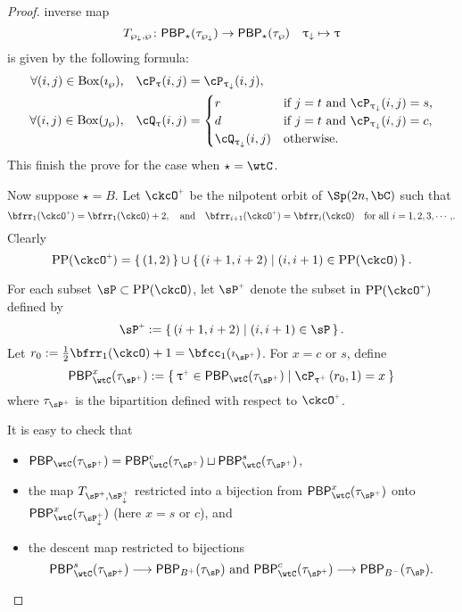 \documentclass[counting_main.tex]{subfiles}
\begin{document}
\begin{proof}
  inverse map
  \[
    T_{\wp_{\downarrow},\wp}\colon \mathsf{PBP}_{\star}(\tau_{\wp_{\downarrow}}) \rightarrow \mathsf{PBP}_{\star}(\tau_{\wp})\quad \uptau_{\downarrow} \mapsto \uptau
  \]
  is given by the following formula:
  \[
    \begin{split}
      \text{$\forall (i,j)\in \BOX{\imath_{\wp}}$,} \quad   \cP_{\uptau}(i,j) &=  \cP_{\uptaum}(i,j),\\
      \text{$\forall (i,j)\in \BOX{\jmath_{\wp}}$,} \quad \cQ_{\uptau}(i,j) &= \begin{cases}
        r& \text{if $j=t$ and  $\cP_{\uptaum}(i,j)=s$,}\\
        d& \text{if $j=t$ and  $\cP_{\uptaum}(i,j)=c$,}\\
        \cQ_{\uptaum}(i,j) &\text{otherwise.}
      \end{cases}
    \end{split}
  \]
  This finish the prove for the case when $\star=\wtC$. \medskip

  \def\ckcOa{\ckcO^{\scalebox{.6}{$+$}}}
  \def\sPa{\sP^{\scalebox{.6}{$+$}}}
  \def\sPam{\sP^{\scalebox{.6}{$+$}}_{\downarrow}}
  \def\uptaua{\uptau^{\scalebox{.6}{$+$}}}
  \def\tausPa{\tau_{\sPa}}
  \def\tausPam{\tau_{\sPam}}


  Now suppose $\star = B$. Let $\ckcOa$ be the nilpotent orbit of $\Sp(2n,\bC)$
  such that
  \[
    \bfrr_{1}(\ckcOa) = \bfrr_{1}(\ckcO)+2, \AND \bfrr_{i+1}(\ckcOa) = \bfrr_{i}(\ckcO)\quad \text{for
      all $i=1,2,3,\cdots,$}.
  \]
  Clearly
  \[
    \CPP(\ckcOa) = \set{(1,2)}\cup \set{(i+1,i+2)|(i,i+1)\in \CPP(\ckcO)}.
  \]

  For each subset $\sP\subset \CPP(\ckcO)$, let $\sPa$ denote the subset in
  $\CPP(\ckcOa)$ defined by
  \[
    \sPa:=\set{(i+1,i+2)|(i,i+1)\in \sP}.
  \]
  Let $r_{0}:= \half \bfrr_{1}(\ckcO)+1 = \bfcc_{1}(\imath_{\sPa})$. For $x=c$
  or $s$, define
  \[
    \PBP_{\wtC}^{x}(\tausPa):= \Set{\uptaua\in \PBP_{\wtC}(\tau_{\sPa})|\cP_{\uptaua}\left(r_{0},1\right)=x}
  \]
  where $\tausPa$ is the bipartition defined with respect to $\ckcOa$.

  It is easy to check that
  \begin{itemize}
    \item
    $\PBP_{\wtC}(\tausPa) = \PBP_{\wtC}^{c}(\tausPa)\sqcup \PBP_{\wtC}^{s}(\tausPa)$,
    \item the map $T_{\sPa,\sPam}$ restricted into a bijection from
    $\PBP_{\wtC}^{x}(\tausPa)$ onto $\PBP_{\wtC}^{x}(\tausPam)$ (here $x=s$ or
    $c$), and
    \item the descent map restricted to bijections
    \[
      \text{
          $\PBP_{\wtC}^{s}(\tau_{\sPa})\longrightarrow \PBP_{B^{+}}(\tau_{\sP})$
          and
          $\PBP_{\wtC}^{c}(\tau_{\sPa})\longrightarrow \PBP_{B^{-}}(\tau_{\sP})$.
      }
    \]
  \end{itemize}



\end{proof}
\end{document}
